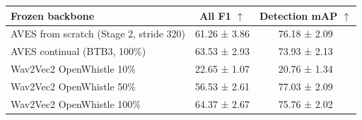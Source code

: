 \begin{tabular}{lcc}
\toprule
Frozen backbone & All F1 $\uparrow$ & Detection mAP $\uparrow$ \\
\midrule
AVES from scratch (Stage 2, stride 320) & 61.26 ± 3.86 & 76.18 ± 2.09 \\
AVES continual (BTB3, 100\%) & 63.53 ± 2.93 & 73.93 ± 2.13 \\
Wav2Vec2 OpenWhistle 10\% & 22.65 ± 1.07 & 20.76 ± 1.34 \\
Wav2Vec2 OpenWhistle 50\% & 56.53 ± 2.61 & 77.03 ± 2.09 \\
Wav2Vec2 OpenWhistle 100\% & 64.37 ± 2.67 & 75.76 ± 2.02 \\
\bottomrule
\end{tabular}
